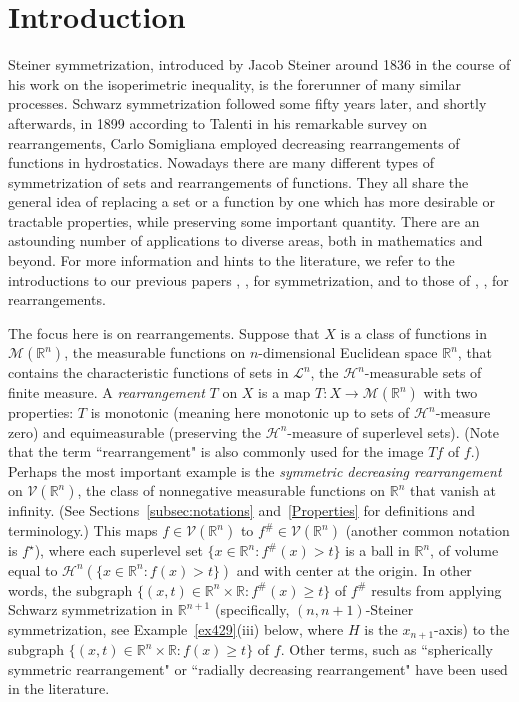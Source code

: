 \documentclass[12pt,reqno]{amsart}
\newcommand{\R}{{\mathbb R}}
\newcommand{\cH}{{\mathcal H}}
\newcommand{\cL}{\mathcal L}
\newcommand{\cM}{\mathcal M}
\newcommand{\cV}{{\mathcal V}}
\numberwithin{equation}{section}
\begin{document}
\section{Introduction}

Steiner symmetrization, introduced by Jacob Steiner around 1836 in the course of his work on the isoperimetric inequality, is the forerunner of many similar processes. Schwarz symmetrization followed some fifty years later, and shortly afterwards, in 1899 according to Talenti in his remarkable survey \cite[Section~2]{Tal} on rearrangements, Carlo Somigliana employed decreasing rearrangements of functions in hydrostatics. Nowadays there are many different types of symmetrization of sets and rearrangements of functions.  They all share the general idea of replacing a set or a function by one which has more desirable or tractable properties, while preserving some important quantity. There are an astounding number of applications to diverse areas, both in mathematics and beyond.  For more information and hints to the literature, we refer to the introductions to our previous papers \cite{BGG1}, \cite{BGG2}, for symmetrization, and to those of \cite{BGGK1}, \cite{BGGK2}, for rearrangements.

The focus here is on rearrangements.  Suppose that $X$ is a class of functions in $\cM(\R^n)$, the measurable functions on $n$-dimensional Euclidean space $\R^n$, that contains the characteristic functions of sets in $\cL^n$, the $\cH^n$-measurable sets of finite measure.  A {\em rearrangement} $T$ on $X$ is a map $T:X\to\cM(\R^n)$ with two properties:  $T$ is monotonic (meaning here monotonic up to sets of $\cH^n$-measure zero) and equimeasurable (preserving the $\cH^n$-measure of superlevel sets).  (Note that the term ``rearrangement" is also commonly used for the image $Tf$ of $f$.) Perhaps the most important example is the {\em symmetric decreasing rearrangement} on $\cV(\R^n)$, the class of nonnegative measurable functions on $\R^n$ that vanish at infinity.  (See Sections~\ref{subsec:notations} and~\ref{Properties} for definitions and terminology.)  This maps $f\in \cV(\R^n)$ to $f^{\#}\in \cV(\R^n)$ (another common notation is $f^{\star}$), where each superlevel set $\{x\in \R^n: f^{\#}(x)> t\}$ is a ball in $\R^n$, of volume equal to $\cH^n(\{x\in \R^n: f(x)> t\})$ and with center at the origin.  In other words, the subgraph $\{(x,t)\in \R^n\times \R: f^{\#}(x)\ge t\}$ of $f^{\#}$ results from applying Schwarz symmetrization in $\R^{n+1}$ (specifically, $(n,n+1)$-Steiner symmetrization, see Example~\ref{ex429}(iii) below, where $H$ is the $x_{n+1}$-axis) to the subgraph $\{(x,t)\in \R^n\times \R: f(x)\ge t\}$ of $f$. Other terms, such as ``spherically symmetric rearrangement" or ``radially decreasing rearrangement" have been used in the literature.
\end{document}
